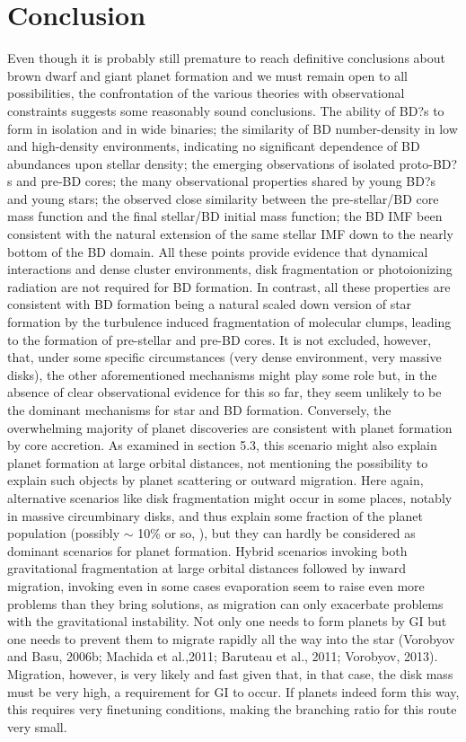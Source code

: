 \section {Conclusion}
Even though it is probably still premature to reach definitive conclusions about brown dwarf and giant planet formation 
and we must remain open to all possibilities, the confrontation of the various theories with observational constraints 
suggests some reasonably sound conclusions. The ability of BD?s to form in isolation
and in wide binaries; the similarity of BD number-density in low and high-density environments, indicating
no significant dependence of BD abundances upon stellar density; the emerging observations of isolated proto-BD?s
and pre-BD cores; the many observational properties shared by young BD?s and young stars; the observed close 
similarity between the pre-stellar/BD core mass function and the final stellar/BD initial mass function; 
the BD IMF been consistent with the natural extension of the same stellar IMF down to the nearly bottom of the BD domain. 
All these points provide evidence that dynamical interactions and dense cluster environments, disk fragmentation or photoionizing 
radiation are not required for BD formation. In contrast, all these properties are consistent with BD formation being a
natural scaled down version of star formation by the turbulence induced fragmentation of molecular clumps, leading
to the formation of pre-stellar and pre-BD cores. It is not excluded, however, that, under some specific circumstances
(very dense environment, very massive disks), the other aforementioned mechanisms might play some role but, in
the absence of clear observational evidence for this so far, they seem unlikely to be the dominant mechanisms for star
and BD formation.
Conversely, the overwhelming majority of planet discoveries are consistent with planet formation by core accretion.
As examined in section 5.3, this scenario might also explain planet formation at large orbital distances, not mentioning
the possibility to explain such objects by planet scattering or outward migration. Here again, alternative scenarios like
disk fragmentation might occur in some places, notably in massive circumbinary disks, and thus explain some fraction of the planet population (possibly $\sim$ 10\% or so, \cite[e.g.][]{Vorobyov2013}), but they can hardly be considered as
dominant scenarios for planet formation. Hybrid scenarios invoking both gravitational fragmentation at large orbital
distances followed by inward migration, invoking even in some cases evaporation seem
to raise even more problems than they bring solutions, as migration can only exacerbate problems with the gravitational 
instability. Not only one needs to form planets by GI but one needs to prevent them to migrate rapidly all the way
into the star (Vorobyov and Basu, 2006b; Machida et al.,2011; Baruteau et al., 2011; Vorobyov, 2013). Migration,
however, is very likely and fast given that, in that case, the disk mass must be very high, a requirement for GI to occur. 
If planets indeed form this way, this requires very finetuning conditions, making the branching ratio for this route
very small.

